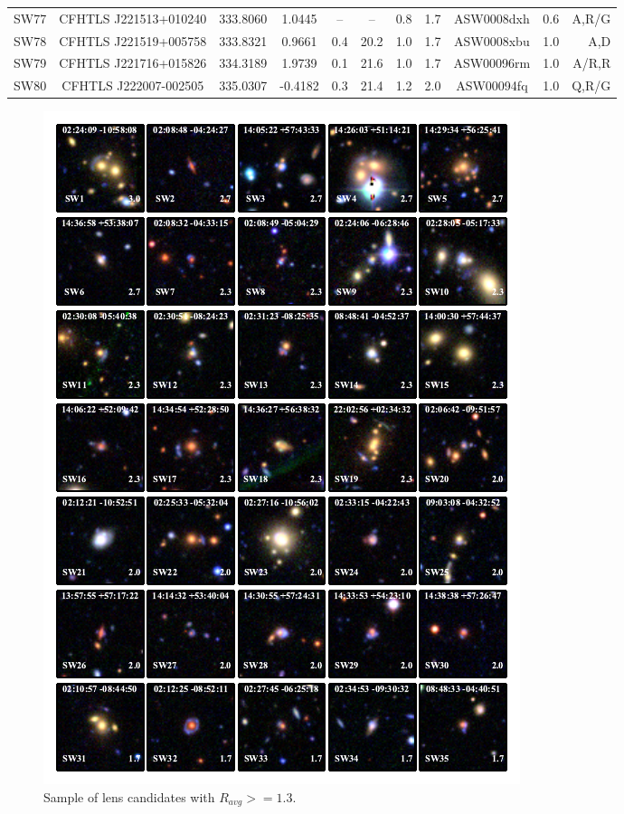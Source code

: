 \documentclass[useAMS,usenatbib,a4paper]{mn2e}
\begin{document}
\begin{center}
\begin{longtable}{lcccccccccr}
SW77 & CFHTLS J221513+010240 &  333.8060 &    1.0445 &  --  &  --  &  0.8 &  1.7 & ASW0008dxh &  0.6  &  A,R/G   \\ 
SW78 & CFHTLS J221519+005758 &  333.8321 &    0.9661 &  0.4 & 20.2 &  1.0 &  1.7 & ASW0008xbu &  1.0  &  A,D   \\ 
SW79 & CFHTLS J221716+015826 &  334.3189 &    1.9739 &  0.1 & 21.6 &  1.0 &  1.7 & ASW00096rm &  1.0  &  A/R,R   \\ 
SW80 & CFHTLS J222007-002505 &  335.0307 &   -0.4182 &  0.3 & 21.4 &  1.2 &  2.0 & ASW00094fq &  1.0  &  Q,R/G   \\ 
\end{longtable}
\end{center}


\twocolumn

\begin{figure}
\begin{center}
\includegraphics[scale=1.5]{sw-cfhtls-figs/lenscandfin.pdf}
\caption{ \label{fig:lch1}
Sample of lens candidates with $R_{avg}>=1.3$.
}
\end{center}
\end{figure}
\end{document}
